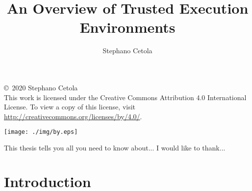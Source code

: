 \documentclass[12pt,oneside,letterpaper]{PSUreport}
\begin{document}
\title{An Overview of Trusted Execution Environments}
\subtitle{}
\author{Stephano Cetola}
\submitdate{\today}                                    %

\copyrightfalse
\figurespagefalse
\tablespagefalse
\null\vfill
\begin{center}
        \copyright\ 2020 Stephano Cetola \\
        This work is licensed under the Creative Commons Attribution 4.0 International License. To view a copy of this license, visit \url{http://creativecommons.org/licenses/by/4.0/}.
\end{center}
\begin{center}
\texttt{[image: ./img/by.eps]}
\end{center}
\vfill\newpage
 
\beforepreface
{}
This thesis tells you all you need to know about...
I would like to thank...
\afterpreface

\printnoidxglossary[type=\acronymtype]

\glsresetall
\chapter{Introduction}




\end{document}

